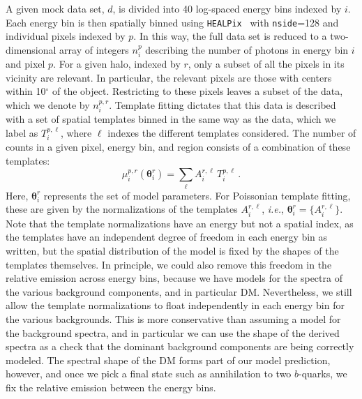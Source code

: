 A given mock data set, $d$, is divided into 40 log-spaced energy bins indexed by $i$. Each energy bin is then spatially binned using \texttt{HEALPix}~\cite{Gorski:2004by} with \texttt{nside}=128 and individual pixels indexed by $p$.  In this way, the full data set is reduced to a two-dimensional array of integers $n_i^p$ describing the number of photons in energy bin $i$ and pixel $p$.  For a given halo, indexed by $r$, only a subset of all the pixels in its vicinity are relevant.  In particular, the relevant pixels are those with centers within 10$^{\circ}$ of the object.  Restricting to these pixels leaves a subset of the data, which we denote by $n_i^{p,r}$. Template fitting dictates that this data is described with a set of spatial templates binned in the same way as the data, which we label as $T^{p,\ell}_i$, where $\ell$ indexes the different templates considered. The number of counts in a given pixel, energy bin, and region consists of a combination of these templates:
\begin{equation}
\mu_i^{p,r}({\boldsymbol \theta_i^r}) = \sum_{\ell} A^{r, \ell}_i\,T^{p,\ell}_i\,.
\end{equation}
Here, ${\boldsymbol \theta_i^r}$ represents the set of model parameters. For Poissonian template fitting, these are given by the normalizations of the templates $A^{r,\ell}_i$, \emph{i.e.}, ${\boldsymbol \theta_i^r} = \{ A^{r,\ell}_i \}$. Note that the template normalizations have an energy but not a spatial index, as the templates have an independent degree of freedom in each energy bin as written, but the spatial distribution of the model is fixed by the shapes of the templates themselves.  In principle, we could also remove this freedom in the relative emission across energy bins, because we have models for the spectra of the various background components, and in particular DM. Nevertheless, we still allow the template normalizations to float independently in each energy bin for the various backgrounds. This is more conservative than assuming a model for the background spectra, and in particular we can use the shape of the derived spectra as a check that the dominant background components are being correctly modeled. The spectral shape of the DM forms part of our model prediction, however, and once we pick a final state such as annihilation to two $b$-quarks, we fix the relative emission between the energy bins.

